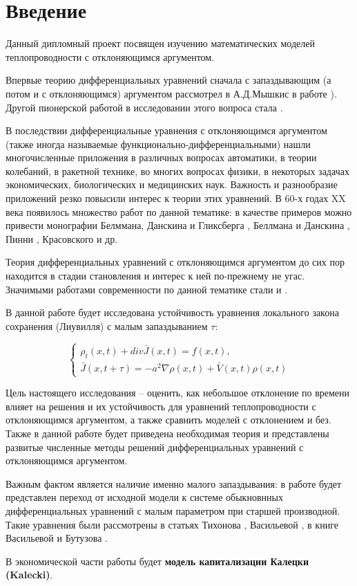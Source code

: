 \section*{Введение}

Данный дипломный проект посвящен изучению математических моделей теплопроводности с отклоняющимся аргументом. 

Впервые теорию дифференциальных уравнений сначала с запаздывающим (а потом и с отклоняющимся) аргументом рассмотрел в А.Д.Мышкис в работе \cite{bib:Myshkis-main}). Другой пионерской работой в исследовании этого вопроса стала \cite{bib:Hahn}.

В последствии дифференциальные уравнения с отклоняющимся аргументом (также иногда называемые функционально-дифференциальными) нашли многочисленные приложения в различных вопросах автоматики, в теории колебаний, в ракетной технике, во многих вопросах физики, в некоторых задачах экономических, биологических и медицинских наук. Важность и разнообразие приложений резко повысили интерес к теории этих уравнений. В 60-х годах XX века появилось множество работ по данной тематике: в качестве примеров можно привести монографии Белммана, Данскина и Гликсберга \cite{bib:Bellman-co}, Беллмана и Данскина \cite{bib:Bellman-Danskin}, Пинни \cite{bib:Pinny}, Красовского \cite{bib:Krasovskii} и др.

Теория дифференциальных уравнений с отклоняющимся аргументом до сих пор находится в стадии становления и интерес к ней по-прежнему не угас. Значимыми работами современности по данной тематике стали \cite{bib:Wu} и \cite{bib:Kolmanovskii-Myshkis}.

В данной работе будет исследована устойчивость уравнения локального закона сохранения (Лиувилля) с малым запаздыванием $\tau$:

\begin{equation*}
\left\{
\begin{aligned}
\rho_t(x,t) + div \bar{J}(x,t) = f(x,t),\\
\bar{J}(x,t+\tau) = -a^2 \nabla \rho(x,t) + \bar{V}(x,t) \rho(x,t)
\end{aligned}
\right.
\end{equation*}

Цель настоящего исследования \--- оценить, как небольшое отклонение по времени влияет на решения и их устойчивость для уравнений теплопроводности с отклоняющимся аргументом, а также сравнить моделей с отклонением и без. Также в данной работе будет приведена необходимая теория и представлены развитые численные методы решений дифференциальных уравнений с отклоняющимся аргументом.

Важным фактом является наличие именно малого запаздывания: в работе будет представлен переход от исходной модели к системе обыкновнных дифференциальных уравнений с малым параметром при старшей производной. Такие уравнения были рассмотрены в статьях Тихонова \cite{bib:Tikhonov_1, bib:Tikhonov_2}, Васильевой \cite{bib:Vasilieva}, в книге Васильевой и Бутузова \cite{bib:Vasilieva-Butuzov}.

В экономической части работы будет \textbf{модель капитализации Калецки (Kalecki)}\cite{bib:Kalecki}.
